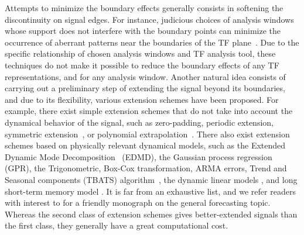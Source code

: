 \documentclass[journal]{IEEEtran}
\begin{document}
Attempts to minimize the boundary effects generally consists in softening the discontinuity on signal edges. For instance, judicious choices of analysis windows whose support does not interfere with the boundary points can minimize the occurrence of aberrant patterns near the boundaries of the TF plane~\cite{Chui92wavelets,Depczynski99fast}. Due to the specific relationship of chosen analysis windows and TF analysis tool, these techniques do not make it possible to reduce the boundary effects of any TF representations, and for any analysis window. Another natural idea consists of carrying out a preliminary step of extending the signal beyond its boundaries, and due to its flexibility, various extension schemes have been proposed. For example, there exist simple extension schemes that do not take into account the dynamical behavior of the signal, such as zero-padding, periodic extension, symmetric extension~\cite{Kharitonenko02wavelet,Chen95symmetric}, or polynomial extrapolation~\cite{Williams97discrete}. There also exist extension schemes based on physically relevant dynamical models, such as the Extended Dynamic Mode Decomposition~\cite{Williams15data} (EDMD), the Gaussian process regression~\cite{Rasmussen06gaussian,Roberts13Gaussian} (GPR), the Trigonometric, Box-Cox transformation, ARMA errors, Trend and Seasonal components (TBATS) algorithm~\cite{DeLivera11forecasting}, the dynamic linear models \cite{west2006bayesian}, and long short-term memory model \cite{vlachas2018data}. It is far from an exhaustive list, and we refer readers with interest to \cite{hyndman2018forecasting} for a friendly monograph on the general forecasting topic. Whereas the second class of extension schemes gives better-extended signals than the first class, they generally have a great computational cost. 
\end{document}

